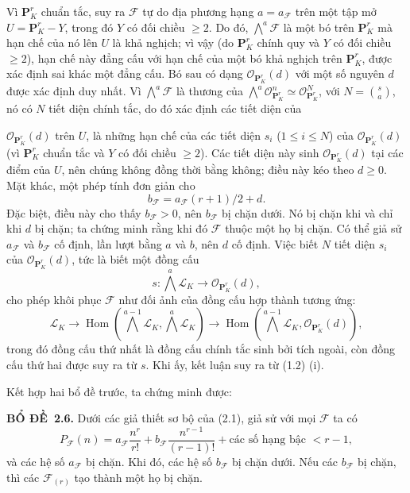 \documentclass[11pt,twoside,openany]{book}
\numberwithin{equation}{section}
\newcommand{\src}[1]{%
  \phantomsection\hypertarget{src:\fgasourceid:#1}{}%
  \marginpar{\raggedleft\footnotesize\sffamily #1}%
}
\newcommand{\fgasourceid}{unset}
\newcommand{\result}[2]{\par\medskip\noindent\textbf{#1\if\relax\detokenize{#2}\relax\else\ #2\fi.}\quad}
\begin{document}
Vì $\mathbf P^r_K$ chuẩn tắc, suy ra $\mathcal F$ tự do địa phương hạng
$a=a_{\mathcal F}$ trên một tập mở $U=\mathbf P^r_K-Y$, trong đó $Y$ có đối
chiều $\geq2$. Do đó, $\bigwedge^a\mathcal F$ là một bó trên
$\mathbf P^r_K$ mà hạn chế của nó lên $U$ là khả nghịch; vì vậy (do
$\mathbf P^r_K$ chính quy và $Y$ có đối chiều $\geq2$), hạn chế này đẳng cấu
với hạn chế của một bó khả nghịch trên $\mathbf P^r_K$, được xác định sai khác
một đẳng cấu. Bó sau có dạng $\mathcal O_{\mathbf P^r_K}(d)$ với một số nguyên
$d$ được xác định duy nhất. Vì $\bigwedge^a\mathcal F$ là thương của
$\bigwedge^a\mathcal O_{\mathbf P^r_K}^{n}\simeq
\mathcal O_{\mathbf P^r_K}^{N}$, với $N=\binom{s}{a}$, nó có $N$ tiết diện chính tắc, do đó xác
định các tiết diện của
\src{257}
$\mathcal O_{\mathbf P^r_K}(d)$ trên $U$, là những hạn chế của các tiết diện
$s_i$ ($1\leq i\leq N$) của $\mathcal O_{\mathbf P^r_K}(d)$ (vì
$\mathbf P^r_K$ chuẩn tắc và $Y$ có đối chiều $\geq2$). Các tiết diện này sinh
$\mathcal O_{\mathbf P^r_K}(d)$ tại các điểm của $U$, nên chúng không đồng thời
bằng không; điều này kéo theo $d\geq0$. Mặt khác, một phép tính đơn giản cho
\[
b_{\mathcal F}=a_{\mathcal F}(r+1)/2+d.
\]
Đặc biệt, điều này cho thấy $b_{\mathcal F}>0$, nên $b_{\mathcal F}$ bị chặn
dưới. Nó bị chặn khi và chỉ khi $d$ bị chặn; ta chứng minh rằng khi đó
$\mathcal F$ thuộc một họ bị chặn. Có thể giả sử $a_{\mathcal F}$ và
$b_{\mathcal F}$ cố định, lần lượt bằng $a$ và $b$, nên $d$ cố định. Việc biết
$N$ tiết diện $s_i$ của $\mathcal O_{\mathbf P^r_K}(d)$, tức là biết một đồng
cấu
\[
s:\bigwedge^a\mathcal L_K\longrightarrow\mathcal O_{\mathbf P^r_K}(d),
\]
cho phép khôi phục $\mathcal F$ như đối ảnh của đồng cấu hợp thành tương ứng:
\[
\mathcal L_K\longrightarrow
\operatorname{Hom}\!\left(\bigwedge^{a-1}\mathcal L_K,
\bigwedge^a\mathcal L_K\right)\longrightarrow
\operatorname{Hom}\!\left(\bigwedge^{a-1}\mathcal L_K,
\mathcal O_{\mathbf P^r_K}(d)\right),
\]
trong đó đồng cấu thứ nhất là đồng cấu chính tắc sinh bởi tích ngoài, còn đồng
cấu thứ hai được suy ra từ $s$. Khi ấy, kết luận suy ra từ (1.2) (i).

Kết hợp hai bổ đề trước, ta chứng minh được:

\result{BỔ ĐỀ}{2.6} Dưới các giả thiết sơ bộ của (2.1), giả sử với mọi
$\mathcal F$ ta có
\[
P_{\mathcal F}(n)=a_{\mathcal F}\frac{n^r}{r!}
+b_{\mathcal F}\frac{n^{r-1}}{(r-1)!}
+\text{các số hạng bậc $<r-1$},
\]
và các hệ số $a_{\mathcal F}$ bị chặn. Khi đó, các hệ số $b_{\mathcal F}$ bị
chặn dưới. Nếu các $b_{\mathcal F}$ bị chặn, thì các $\mathcal F_{(r)}$ tạo
thành một họ bị chặn.
\end{document}
